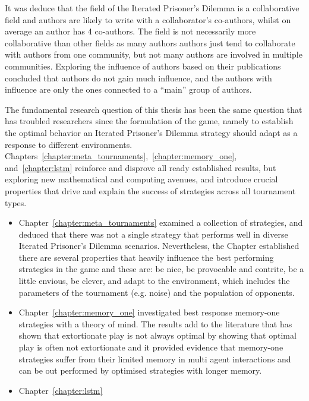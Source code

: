 It was deduce that the field of the Iterated Prisoner's Dilemma is a
collaborative field and authors are likely to write with a collaborator's
co-authors, whilst on average an author has 4 co-authors. The field is not
necessarily more collaborative than other fields as many authors authors just
tend to collaborate with authors from one community, but not many authors are
involved in multiple communities. Exploring the influence of authors based on
their publications concluded that authors do not gain much influence, and the
authors with influence are only the ones connected to a ``main'' group of
authors.

The fundamental research question of this thesis has been the same question that
has troubled researchers since the formulation of the game, namely to establish
the optimal behavior an Iterated Prisoner's Dilemma strategy should adapt as a
response to different environments.
Chapters~\ref{chapter:meta_tournaments},~\ref{chapter:memory_one},
and~\ref{chapter:lstm} reinforce and disprove all ready established results, but
exploring new mathematical and computing avenues, and introduce crucial
properties that drive and explain the success of strategies across all
tournament types.

\begin{itemize}
    \item Chapter~\ref{chapter:meta_tournaments} examined a collection of
    \numberofstrategies strategies, and deduced that there was not a single
    strategy that performs well in diverse Iterated Prisoner’s Dilemma
    scenarios. Nevertheless, the Chapter established there are several
    properties that heavily influence the best performing strategies in the game
    and these are: be nice, be provocable and contrite, be a little envious, be
    clever, and adapt to the environment, which includes the parameters of the
    tournament (e.g. noise) and the population of opponents.
    \item Chapter~\ref{chapter:memory_one} investigated  best response memory-one
    strategies with a theory of mind. The results add to the 
    literature that has shown that extortionate play is not always optimal by
    showing that optimal play is often not extortionate and it provided
    evidence that memory-one strategies suffer from their limited memory in
    multi agent interactions and can be out performed by optimised strategies
    with longer memory.
    \item Chapter~\ref{chapter:lstm} %
\end{itemize}

